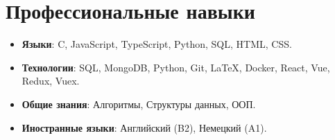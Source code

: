 \documentclass[letterpaper,10pt]{article}
\newcommand{\resumeSubHeadingListStart}{\begin{itemize}[leftmargin=*]}
\newcommand{\resumeSubHeadingListEnd}{\end{itemize}}
\begin{document}
	
	\section{Профессиональные навыки}
	\resumeSubHeadingListStart
	\item{
		\textbf{Языки}{: C, JavaScript, TypeScript, Python, SQL, HTML, CSS. }
	}\vspace{-7pt}
	\item{
		\textbf{Технологии}{: SQL, MongoDB, Python, Git, \LaTeX, Docker, React, Vue, Redux, Vuex. }
	}
	\vspace{-7pt}
	\item{
		\textbf{Общие знания}{: Алгоритмы, Структуры данных, ООП.}
	}
	\item{
		\textbf{Иностранные языки}{: Английский (B2), Немецкий (A1).}
	}
	\resumeSubHeadingListEnd
	
	
\end{document}
